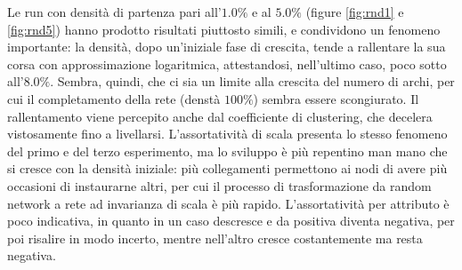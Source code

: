 \documentclass[a4paper,12pt]{article}
\begin{document}
Le run con densità di partenza pari all'$1.0\%$ e al $5.0\%$ (figure \ref{fig:rnd1} e \ref{fig:rnd5}) hanno prodotto risultati piuttosto simili, e condividono un fenomeno importante: la densità, dopo un'iniziale fase di crescita, tende a rallentare la sua corsa con approssimazione logaritmica, attestandosi, nell'ultimo caso, poco sotto all'$8.0\%$. Sembra, quindi, che ci sia un limite alla crescita del numero di archi, per cui il completamento della rete (denstà $100\%$) sembra essere scongiurato. Il rallentamento viene percepito anche dal coefficiente di clustering, che decelera vistosamente fino a livellarsi. L'assortatività di scala presenta lo stesso fenomeno del primo e del terzo esperimento, ma lo sviluppo è più repentino man mano che si cresce con la densità iniziale: più collegamenti permettono ai nodi di avere più occasioni di instaurarne altri, per cui il processo di trasformazione da random network a rete ad invarianza di scala è più rapido. L'assortatività per attributo è poco indicativa, in quanto in un caso descresce e da positiva diventa negativa, per poi risalire in modo incerto, mentre nell'altro cresce costantemente ma resta negativa.
\end{document}
